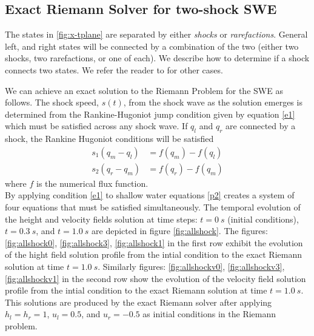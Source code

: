 \documentclass[10pt,a4paper]{article}
\newcommand{\donna}[1]{{\color{red}{#1}}}
\newcommand{\ignore}[1]{}
\begin{document}
	

	\subsection{Exact Riemann Solver for two-shock SWE}
The states in \ref{fig:x-tplane} are separated by either {\em shocks} or {\em rarefactions}. General left, and right states will be connected by a combination of the two (either two shocks, two rarefactions, or one of each).  We describe how to determine if a shock connects two states.  We refer the reader to \citet{leveque2002finite} for other cases. 

We can achieve an exact solution to the Riemann Problem for the SWE as follows. 
The shock speed, $s(t)$,  from the shock wave as the solution emerges is determined from the Rankine-Hugoniot jump condition given by equation \eqref{e1}  which must be satisfied across any shock wave.  If $q_l$ and $q_r$ are connected by a shock, the Rankine Hugoniot conditions will be satisfied \donna{reference Leveque or Toro here;  not mandli} \ignore{\cite{ma-ah-be-ca-ge-ha-ke-le-le:2016}.}
	\begin{equation}
		\begin{aligned}
			s_1(q_{m} - q_{l}) & = f(q_{m}) - f(q_{l}) \\
			s_2(q_{r} - q_{m}) & = f(q_{r}) - f(q_{m})
		\end{aligned}
		\label{e1}
	\end{equation}
where $f$ is the numerical flux function. \\

By applying condition  \eqref{e1} to shallow water equations \eqref{p2}  creates a system of four equations that must be satisfied simultaneously. The temporal evolution of the height and velocity fields solution at time steps: $t=0~s$ (initial conditions), $t = 0.3~s$, and $t = 1.0~s$ are  depicted in figure \ref{fig:allshock}. The figures: \ref{fig:allshock0}, \ref{fig:allshock3}, \ref{fig:allshock1} in the first row exhibit the evolution of the hight field solution profile from the intial condition to the exact Riemann solution at time $t = 1.0~s$. Similarly figures: \ref{fig:allshockv0}, \ref{fig:allshockv3}, \ref{fig:allshockv1} in the second row show the evolution of the velocity field solution profile from the intial condition to the exact Riemann solution at time $t = 1.0~s$. This solutions are produced by the exact Riemann solver after applying $h_l = h_r = 1$, $u_l  =  0.5$, and $u_r = -0.5$ as initial conditions in  the Riemann problem.
	
\end{document}
